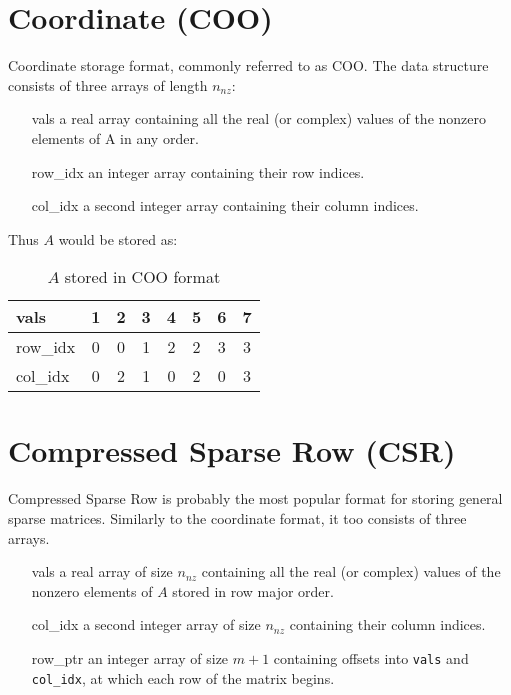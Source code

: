 \documentclass[thesis=M,english]{FITthesis}[2019/12/23]
\begin{document}
\section{Coordinate (COO)}

Coordinate storage format, commonly referred to as COO.
The data structure consists of three arrays of length $n_{nz}$\cite{saad03:IMS}:

\begin{enumerate}
	\itemsep=0em
	\item[vals] a real array containing all the real (or complex) values of the nonzero elements of A in any order.
	\item[row\_idx] an integer array containing their row indices.
	\item[col\_idx] a second integer array containing their column indices.
\end{enumerate}

Thus $A$ would be stored as:

\begin{table}[h!]
	\centering
	\begin{tabular}{ |l||c|c|c|c|c|c|c| }
		\hline
		vals     & 1 & 2 & 3 & 4 & 5 & 6 & 7 \\
		\hline
		row\_idx & 0 & 0 & 1 & 2 & 2 & 3 & 3 \\
		\hline
		col\_idx & 0 & 2 & 1 & 0 & 2 & 0 & 3 \\
		\hline
	\end{tabular}
	\caption{$A$ stored in COO format}
\end{table}


\section{Compressed Sparse Row (CSR)}

Compressed Sparse Row is probably the most popular format for storing general sparse matrices.
\cite{saad03:IMS} Similarly to the coordinate format, it too consists of three arrays.

\begin{enumerate}
	\itemsep=0em
	\item[vals] a real array of size $n_{nz}$ containing all the real (or complex) values of the nonzero elements of $A$
		stored in row major order.
	\item[col\_idx] a second integer array of size $n_{nz}$ containing their column indices.
	\item[row\_ptr] an integer array of size $m + 1$ containing offsets into \lstinline{vals} and
		\lstinline!col_idx!, at which each row of the matrix begins.
\end{enumerate}
\end{document}
